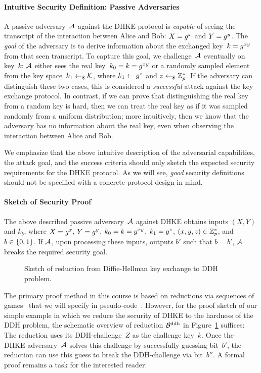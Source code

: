 \paragraph{Intuitive Security Definition: Passive Adversaries}
A passive adversary~$\mathcal{A}$ against the DHKE protocol is \emph{capable} of seeing the transcript of the interaction between Alice and Bob: $X=g^x$ and $Y=g^y$.
The \emph{goal} of the adversary is to derive information about the exchanged key~$k=g^{xy}$ from that seen transcript.
To capture this goal, we challenge~$\mathcal{A}$ eventually on key~$k$:
$\mathcal{A}$ either sees the real key~$k_0=k=g^{xy}$ or a randomly sampled element from the key space~$k_1\gets_\$\mathcal{K}$, where $k_1\gets g^z$ and $z\gets_\$\mathbb{Z}_p^*$.
If the adversary can distinguish these two cases, this is considered a \emph{successful} attack against the key exchange protocol.
In contrast, if we can prove that distinguishing the real key from a random key is hard, then we can treat the real key as if it was sampled randomly from a uniform distribution;
more intuitively, then we know that the adversary has no information about the real key, even when observing the interaction between Alice and Bob.

We emphasize that the above intuitive description of the adversarial capabilities, the attack goal, and the success criteria should only sketch the expected security requirements for the DHKE protocol.
As we will see, \emph{good} security definitions should not be specified with a concrete protocol design in mind.

\paragraph{Sketch of Security Proof}
The above described passive adversary~$\mathcal{A}$ against DHKE obtains inputs $(X,Y)$ and $k_b$, where $X=g^x$, $Y=g^y$, $k_0=k=g^{xy}$, $k_1=g^z$, $(x,y,z)\in\mathbb{Z}_p^*$, and $b\in\{0,1\}$.
If $\mathcal{A}$, upon processing these inputs, outputs $b'$ such that $b=b'$, $\mathcal{A}$ breaks the required security goal.

\begin{figure}
    \centering
    
    \caption{Sketch of reduction from Diffie-Hellman key exchange to DDH problem.}
    \label{fig:dhke:reduction}
\end{figure}

The primary proof method in this course is based on reductions via sequences of games~\cite{EPRINT:Shoup04} that we will specify in pseudo-code~\cite{EC:BelRog06}.
However, for the proof sketch of our simple example in which we reduce the security of DHKE to the hardness of the DDH problem, the schematic overview of reduction $\mathcal{B}^{\mathrm{ddh}}$ in Figure~\ref{fig:dhke:reduction} suffices:
The reduction uses its DDH-challenge~$Z$ as the challenge key~$k$.
Once the DHKE-adversary~$\mathcal{A}$ solves this challenge by successfully guessing bit~$b'$, the reduction can use this guess to break the DDH-challenge via bit~$b''$.
A formal proof remains a task for the interested reader.

